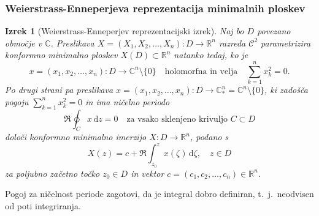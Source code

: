 \documentclass[8pt]{beamer}
\theoremstyle{definition}
\theoremstyle{remark}
\theoremstyle{plain}
\newtheorem{izrek}[definicija]{Izrek}
\numberwithin{equation}{section}  %
\begin{document}
\begin{frame}
    \frametitle{Weierstrass-Enneperjeva reprezentacija minimalnih ploskev}

    \begin{izrek}[Weierstrass-Enneperjev reprezentacijski izrek]
        Naj bo $D$ povezano območje v $\mathbb{C}$. Preslikava $X=\left(X_1, X_2, \ldots, X_n\right): D \rightarrow \mathbb{R}^n$ razreda $\mathscr{C}^2$ parametrizira konformno minimalno ploskev $X(D) \subset \mathbb{R}^n$ natanko tedaj, ko je
        \begin{equation*}
            x=\left(x_1, x_2, \ldots, x_n\right): D \rightarrow \mathbb{C}^n \setminus \{0\} \quad \text{holomorfna in velja} \quad  \sum_{k=1}^n x_k^2=0.
        \end{equation*}
        Po drugi strani pa preslikava $x=\left(x_1, x_2, \ldots, x_n\right): D \rightarrow \mathbb{C}_*^n=\mathbb{C}^n \setminus\{0\}$, ki zadošča pogoju $\sum_{k=1}^nx_k^2=0$ in ima ničelno periodo
        \begin{equation*}
            \Re \oint_C x \, \mathrm{d} z=0 \quad \text{za vsako sklenjeno krivuljo } C \subset D
        \end{equation*}
        določi konformno minimalno imerzijo $X: D \rightarrow \mathbb{R}^n$, podano s 
        \begin{equation*}
            X(z)=c+\Re \int_{z_0}^z x(\zeta) \, \mathrm{d} \zeta, \quad z \in D
        \end{equation*}
        za poljubno začetno točko $z_0 \in D$ in vektor $c=\left(c_1, c_2, \ldots, c_n\right) \in \mathbb{R}^n$.
    \end{izrek}
    Pogoj za ničelnost periode zagotovi, da je integral dobro definiran, t.~j.~neodvisen od poti integriranja.
    
\end{frame}
\end{document}
